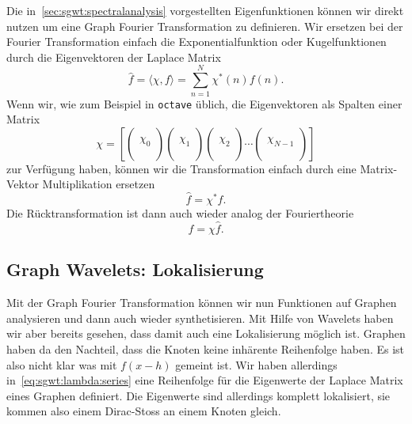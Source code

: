 Die in~\cref{sec:sgwt:spectralanalysis} vorgestellten Eigenfunktionen 
k\"onnen wir direkt nutzen um eine Graph Fourier Transformation zu definieren. 
Wir ersetzen bei der Fourier Transformation einfach die Exponentialfunktion 
oder Kugelfunktionen durch die Eigenvektoren der Laplace Matrix
\begin{equation*}
\hat{f} = \langle \chi, f \rangle = \sum_{n = 1}^{N} \chi^*(n)f(n).
\end{equation*}
Wenn wir, wie zum Beispiel in \texttt{octave} \"ublich, die Eigenvektoren als 
Spalten einer Matrix
\begin{equation}
\chi = 
\left[
\begin{pmatrix}\\\chi_0\\\\\end{pmatrix}
\begin{pmatrix}\\\chi_1\\\\\end{pmatrix}
\begin{pmatrix}\\\chi_2\\\\\end{pmatrix}
\cdots
\begin{pmatrix}\\\chi_{N-1}\\\\\end{pmatrix}
\right]
\end{equation}
zur Verf\"ugung haben, k\"onnen wir die Transformation 
einfach durch eine Matrix-Vektor Multiplikation ersetzen
\begin{equation*}
\hat{f} = \chi^* f.
\end{equation*}
Die R\"ucktransformation ist dann auch wieder analog der Fouriertheorie
\begin{equation*}
f = \chi \hat{f}.
\end{equation*}

\subsection{Graph Wavelets: Lokalisierung\label{subsec:sgwt:gwt:localizing}}

Mit der Graph Fourier Transformation k\"onnen wir nun Funktionen auf Graphen 
analysieren und dann auch wieder synthetisieren. Mit Hilfe von Wavelets haben 
wir aber bereits gesehen, dass damit auch eine Lokalisierung m\"oglich ist. 
Graphen haben da den Nachteil, dass die Knoten keine inh\"arente Reihenfolge 
haben. Es ist also nicht klar was mit $f(x - h)$ gemeint ist. Wir haben 
allerdings in~\cref{eq:sgwt:lambda:series} eine Reihenfolge f\"ur die 
Eigenwerte der Laplace Matrix eines Graphen definiert. Die Eigenwerte sind 
allerdings komplett lokalisiert, sie kommen also einem Dirac-Stoss an 
einem Knoten gleich.

